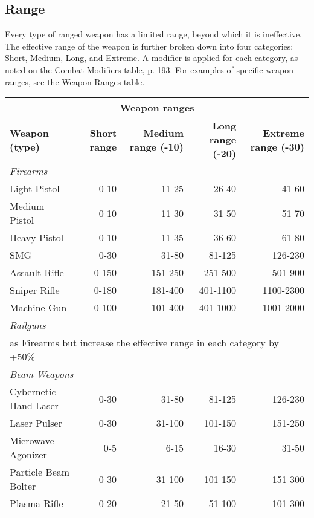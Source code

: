 \subsection{Range}
\label{sec:range}

Every type of ranged weapon has a limited range, beyond which it is ineffective. The effective range of the weapon is further broken down into four categories: Short, Medium, Long, and Extreme. A modifier is applied for each category, as noted on the Combat Modifiers table, p. 193. For examples of specific weapon ranges, see the Weapon Ranges table.

\begin{table} \begin{tabular}{|l|r|r|r|r|}
\hline \multicolumn{5}{|c|}{\textbf{Weapon ranges}} \\
\hline \textbf{Weapon (type)} & \textbf{Short range} & \textbf{Medium range (-10)} & \textbf{Long range (-20)} & \textbf{Extreme range (-30)}\\
\hline \multicolumn{5}{|l|}{\emph{Firearms}} \\
\hline Light Pistol			& 0-10	& 11-25	& 26-40	& 41-60 \\
\hline Medium Pistol		& 0-10	& 11-30	& 31-50	& 51-70 \\
\hline Heavy Pistol			& 0-10	& 11-35	& 36-60	& 61-80 \\
\hline SMG				& 0-30	& 31-80	& 81-125	& 126-230 \\
\hline Assault Rifle		& 0-150	& 151-250	& 251-500	& 501-900 \\
\hline Sniper Rifle			& 0-180	& 181-400	& 401-1100	& 1100-2300 \\
\hline Machine Gun			& 0-100	& 101-400	& 401-1000	& 1001-2000 \\
\hline \multicolumn{5}{|l|}{\emph{Railguns}}\\
\hline \multicolumn{5}{|l|}{as Firearms but increase the effective range in each category by +50\%} \\
\hline \multicolumn{5}{|l|}{\emph{Beam Weapons}} \\
\hline Cybernetic Hand Laser	& 0-30	& 31-80	& 81-125	& 126-230 \\
\hline Laser Pulser			& 0-30	& 31-100	& 101-150	& 151-250 \\
\hline Microwave Agonizer	& 0-5	& 6-15	& 16-30	& 31-50 \\
\hline Particle Beam Bolter	& 0-30	& 31-100	& 101-150	& 151-300 \\
\hline Plasma Rifle			& 0-20	& 21-50	& 51-100	& 101-300 \\

\end{tabular}
\end{table}
